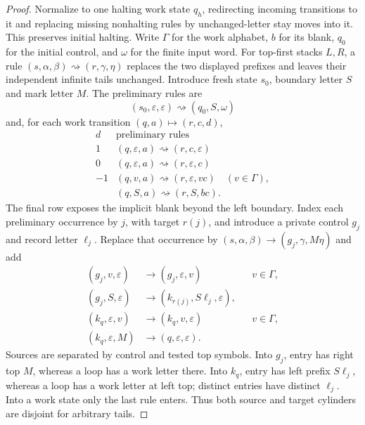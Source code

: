 \begin{proof}\label{proof:bb-prefix29}
Normalize to one halting work state $q_h$, redirecting incoming
transitions to it and replacing missing nonhalting rules by unchanged-letter
stay moves into it. This preserves initial halting.
Write $\Gamma$ for the work alphabet, $b$ for its blank, $q_0$ for the
initial control, and $\omega$ for the finite input word.
For top-first stacks $L,R$, a rule
$(s,\alpha,\beta)\rightsquigarrow(r,\gamma,\eta)$ replaces the
two displayed prefixes and leaves their independent infinite tails
unchanged.  Introduce fresh state $s_0$, boundary letter $S$ and mark
letter $M$.  The preliminary rules are
\[
 (s_0,\varepsilon,\varepsilon)\rightsquigarrow(q_0,S,\omega)
\]
and, for each work transition $(q,a)\mapsto(r,c,d)$,
\[
\begin{array}{c|l}
 d&\text{preliminary rules}\\\hline
1&(q,\varepsilon,a)\rightsquigarrow(r,c,\varepsilon)\\
0&(q,\varepsilon,a)\rightsquigarrow(r,\varepsilon,c)\\
-1&(q,v,a)\rightsquigarrow(r,\varepsilon,vc)\quad(v\in\Gamma),\\
  &(q,S,a)\rightsquigarrow(r,S,bc).
\end{array}
\]
The final row exposes the implicit blank beyond the left boundary.
Index each preliminary occurrence by $j$, with target $r(j)$,
and introduce a private control $g_j$ and record letter $\ell_j$.
Replace that occurrence by
$(s,\alpha,\beta)\to(g_j,\gamma,M\eta)$ and add
\begin{equation}\label{eq:bb-prefix-table}
\begin{aligned}
 (g_j,v,\varepsilon)&\to(g_j,\varepsilon,v)&&v\in\Gamma,\\
 (g_j,S,\varepsilon)&\to(k_{r(j)},S\ell_j,\varepsilon),\\
 (k_q,\varepsilon,v)&\to(k_q,v,\varepsilon)&&v\in\Gamma,\\
 (k_q,\varepsilon,M)&\to(q,\varepsilon,\varepsilon).
\end{aligned}
\end{equation}
Sources are separated by control and tested top symbols.  Into $g_j$,
entry has right top $M$, whereas a loop has a work letter there.
Into $k_q$, entry has left prefix $S\ell_j$, whereas a loop has a
work letter at left top; distinct entries have distinct $\ell_j$.
Into a work state only the last rule enters.  Thus both source and
target cylinders are disjoint for arbitrary tails.


\end{proof}
